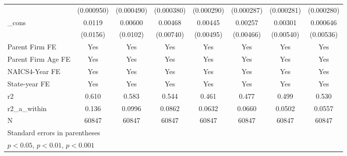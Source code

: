{\begin{tabular}{l*{7}{c}}
            &  (0.000950)         &  (0.000490)         &  (0.000380)         &  (0.000290)         &  (0.000287)         &  (0.000281)         &  (0.000280)         \\
[1em]
\_cons      &      0.0119         &     0.00600         &     0.00468         &     0.00445         &     0.00257         &     0.00301         &    0.000646         \\
            &    (0.0156)         &    (0.0102)         &   (0.00740)         &   (0.00495)         &   (0.00466)         &   (0.00540)         &   (0.00536)         \\
[1em]
Parent Firm FE&         Yes         &         Yes         &         Yes         &         Yes         &         Yes         &         Yes         &         Yes         \\
[1em]
Parent Firm Age FE&         Yes         &         Yes         &         Yes         &         Yes         &         Yes         &         Yes         &         Yes         \\
[1em]
NAICS4-Year FE&         Yes         &         Yes         &         Yes         &         Yes         &         Yes         &         Yes         &         Yes         \\
[1em]
State-year FE&         Yes         &         Yes         &         Yes         &         Yes         &         Yes         &         Yes         &         Yes         \\
\hline
r2          &       0.610         &       0.583         &       0.544         &       0.461         &       0.477         &       0.499         &       0.530         \\
r2\_a\_within &       0.136         &      0.0996         &      0.0862         &      0.0632         &      0.0660         &      0.0502         &      0.0557         \\
N           &       60847         &       60847         &       60847         &       60847         &       60847         &       60847         &       60847         \\
\hline\hline
\multicolumn{8}{l}{\footnotesize Standard errors in parentheses}\\
\multicolumn{8}{l}{\footnotesize \sym{*} \(p<0.05\), \sym{**} \(p<0.01\), \sym{***} \(p<0.001\)}\\
\end{tabular}
}
